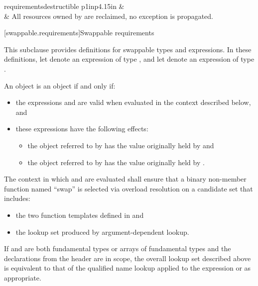 \begin{concepttable}{ requirements}{destructible}
{p{1in}p{4.15in}}
\topline
{}      &     \\ \capsep
{} &   All resources owned by  are reclaimed, no exception is propagated. \\
\end{concepttable}

[swappable.requirements]{Swappable requirements}

\pnum
This subclause provides definitions for swappable types and expressions. In these
definitions, let  denote an expression of type , and let 
denote an expression of type .

\pnum
An object  is  an object  if and only if:

\begin{itemize}
\item the expressions  and  are valid when
evaluated in the context described below, and

\item these expressions have the following effects:

\begin{itemize}
\item the object referred to by  has the value originally held by  and
\item the object referred to by  has the value originally held by .
\end{itemize}
\end{itemize}

\pnum
The context in which  and  are evaluated shall
ensure that a binary non-member function named ``swap'' is selected via overload
resolution on a candidate set that includes:

\begin{itemize}
\item the two  function templates defined in
 and

\item the lookup set produced by argument-dependent lookup.
\end{itemize}

\begin{note} If  and  are both fundamental types or arrays of
fundamental types and the declarations from the header  are in
scope, the overall lookup set described above is equivalent to that of the
qualified name lookup applied to the expression  or
 as appropriate. \end{note}

